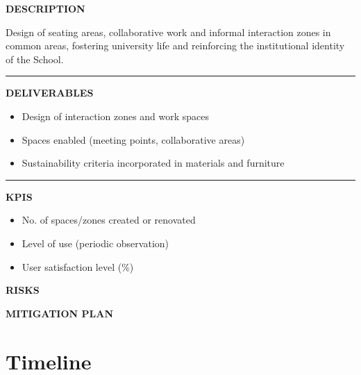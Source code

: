 \documentclass[11pt,a4paper]{scrreprt}
\newcommand{\fieldlabel}[1]{%
  {\footnotesize\sffamily\bfseries\color{mutedcolor}\MakeUppercase{#1}}\par\nopagebreak[4]
}
\newcommand{\fieldsep}{\vspace{3pt}\noindent\textcolor{bordercolor}{\rule{\linewidth}{0.4pt}}\vspace{3pt}\par}
\begin{document}
\begin{tcolorbox}[pabox={espcolor}{A.P.8.1 \enspace\textbullet\enspace Design and Creation of Interaction and Collaborative Work Zones}]

\fieldlabel{Description}
{\small Design of seating areas, collaborative work and informal interaction zones in common areas, fostering university life and reinforcing the institutional identity of the School.}\par
\fieldsep
\fieldlabel{Deliverables}
{\small \begin{itemize}[noitemsep,topsep=2pt]
\item Design of interaction zones and work spaces
\item Spaces enabled (meeting points, collaborative areas)
\item Sustainability criteria incorporated in materials and furniture
\end{itemize}}\par
\fieldsep
\fieldlabel{KPIs}
{\small \begin{itemize}[noitemsep,topsep=2pt]
\item No. of spaces/zones created or renovated
\item Level of use (periodic observation)
\item User satisfaction level (\%)
\end{itemize}}\par
\end{tcolorbox}
\begin{tcolorbox}[riskbox]
{\footnotesize\sffamily\bfseries\color{red!50!black} RISKS}\par{}
\end{tcolorbox}
\begin{tcolorbox}[mitbox]
{\footnotesize\sffamily\bfseries\color{green!40!black} MITIGATION PLAN}\par{}
\end{tcolorbox}
\vspace{8pt}


\section{Timeline}

\small
\end{document}
